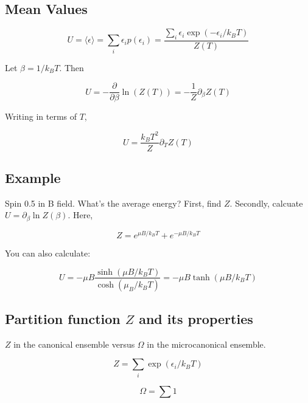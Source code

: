 \documentclass{article}
\newtheorem{one minute paper}[theorem]{One Minute Paper}
\begin{document}
\subsection*{Mean Values}

\begin{equation}
    U = \langle \epsilon \rangle = \sum_i \epsilon_i p(\epsilon_i) = \frac{\sum_i \epsilon_i \exp(-\epsilon_i/k_B T)}{Z(T)}
\end{equation}

Let $\beta = 1/k_B T$. Then 

\begin{equation}
    U = -\frac{\partial}{\partial \beta}\ln(Z(T)) = -\frac{1}{Z}\partial_{\beta} Z(T)
\end{equation}

Writing in terms of $T$, 

\begin{equation}
    U = \frac{k_B T^2}{Z}\partial_T Z(T)
\end{equation}

\subsection*{Example}

Spin 0.5 in B field. What's the average energy? First, find $Z$. Secondly, calcuate $U = \partial_\beta \ln Z(\beta)$. Here, 

\begin{equation}
    Z = e^{\mu B/k_B T} + e^{-\mu B/k_B T}
\end{equation}

You can also calculate:  

\begin{equation}
    U = -\mu B \frac{\sinh(\mu B/ k_B T)}{\cosh(\mu_B/k_B T)} = -\mu B \tanh(\mu B/k_B T)
\end{equation}

\subsection*{Partition function $Z$ and its properties}

$Z$ in the canonical ensemble versus $\Omega$ in the microcanonical ensemble.

\begin{equation}
    Z = \sum_i \exp(\epsilon_i/k_BT)
\end{equation}

\begin{equation}
    \Omega = \sum 1
\end{equation}
\end{document}

